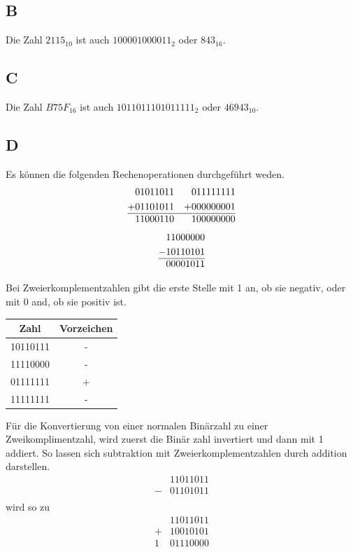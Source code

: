 \documentclass[10pt]{article}
\begin{document}
\begin{multicols}{2}
	\subsection*{B}
	Die Zahl $2115_{10}$ ist auch $1000 0100 0011_2$ oder $843_{16}$.
	\subsection*{C}
	Die Zahl $B75F_{16}$ ist auch $1011011101011111_{2}$ oder $46943_{10}$.
	\subsection*{D}
	Es können die folgenden Rechenoperationen durchgeführt weden.
	\begin{align*}
		  & 01011011 &   & 011111111 \\
		+ & 01101011 & + & 000000001 \\
		\hline
		  & 11000110 &   & 100000000 \\
	\end{align*}
	\begin{align*}
		  & 11000000 \\
		- & 10110101 \\
		\hline
		  & 00001011 \\
	\end{align*}

	Bei Zweierkomplementzahlen gibt die erste Stelle mit 1 an, ob sie negativ, oder mit 0 and, ob sie positiv ist.
	\begin{center}
		\begin{tabular}{|c|c|}
			\hline
			Zahl     & Vorzeichen \\
			\hline
			10110111 & -          \\
			11110000 & -          \\
			01111111 & +          \\
			11111111 & -          \\
			\hline
		\end{tabular}
	\end{center}
	Für die Konvertierung von einer normalen Binärzahl zu einer Zweikomplimentzahl, wird zuerst die Binär zahl invertiert und dann mit 1 addiert.
	So lassen sich subtraktion mit Zweierkomplementzahlen durch addition darstellen.
	\begin{align*}
		  & 11011011 \\
		- & 01101011 \\
	\end{align*}
	wird so zu
	\begin{align*}
		  & 11011011 \\
		+ & 10010101 \\
		\hline
		1 & 01110000 \\
	\end{align*}


\end{multicols}
\end{document}
